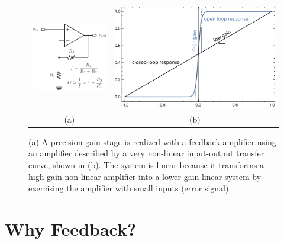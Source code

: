 \newpage
\begin{figure}[tb]
\centering
\begin{tabular}{cc}
\includegraphics[width=.3\columnwidth]{opamp_fb_precise} &
\includegraphics[width=.5\columnwidth]{opamp_gain}\\
(a) & (b) 
\end{tabular}
\caption{(a) A precision gain stage is realized with a feedback amplifier using an amplifier described by a very non-linear input-output transfer curve, shown in (b).  The system is linear because it transforms a high gain non-linear amplifier into a lower gain linear system by exercising the amplifier with small inputs (error signal).}
\label{fig:opamp_fb_precise}
\end{figure}
\section{Why Feedback?}
